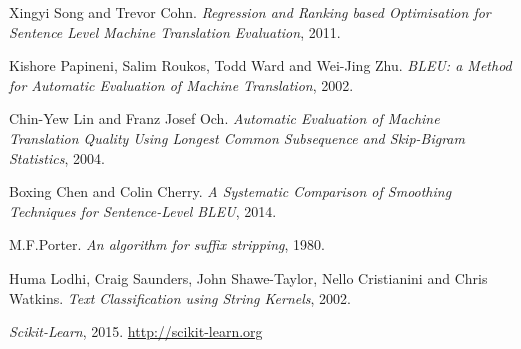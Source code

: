 \documentclass[11pt]{article}
\begin{document}


\begin{thebibliography}{50}
 Xingyi Song and Trevor Cohn. \textsl{Regression and Ranking based Optimisation for Sentence Level Machine Translation Evaluation}, 2011.

 Kishore Papineni, Salim Roukos, Todd Ward and Wei-Jing Zhu. \textsl{BLEU: a Method for Automatic Evaluation of Machine Translation}, 2002.

 Chin-Yew Lin and Franz Josef Och. \textsl{Automatic Evaluation of Machine Translation Quality Using Longest Common Subsequence and Skip-Bigram Statistics}, 2004.

 Boxing Chen and Colin Cherry. \textsl{A Systematic Comparison of Smoothing Techniques for Sentence-Level BLEU}, 2014.

 M.F.Porter. \textsl{An algorithm for suffix stripping}, 1980.

 Huma Lodhi, Craig Saunders, John Shawe-Taylor, Nello Cristianini and Chris Watkins. \textsl{Text Classification using String Kernels}, 2002.

 \textsl{Scikit-Learn}, 2015. \url{http://scikit-learn.org}

\end{thebibliography}
\end{document}
